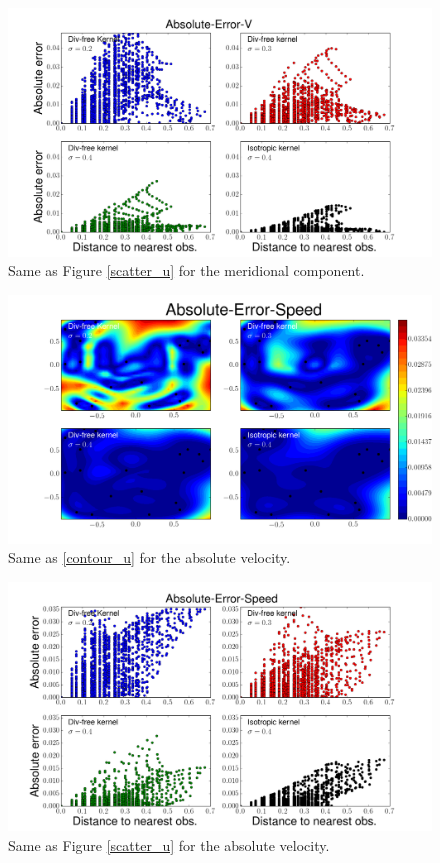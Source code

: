 \documentclass[12pt,a4paper]{article}%
\begin{document}
\begin{figure}
\noindent\includegraphics[width=32pc]{plots/Absolute-Error-V-scatter.png}
\caption{Same as Figure \ref{scatter_u} for the meridional component.  }
\label{scatter_v}
\end{figure}

\begin{figure}
\noindent\includegraphics[width=32pc]{plots/Absolute-Error-Speed-contour.png}
\caption{Same as \ref{contour_u} for the absolute velocity. }
\label{contour_speed}
\end{figure}

\begin{figure}
\noindent\includegraphics[width=32pc]{plots/Absolute-Error-Speed-scatter.png}
\caption{Same as Figure \ref{scatter_u} for the absolute velocity. }
\label{scatter_speed}
\end{figure}
\end{document}
